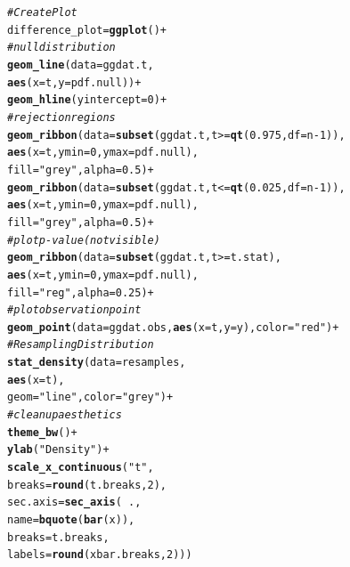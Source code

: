 \documentclass{article}\usepackage[]{graphicx}\usepackage[]{xcolor}
\makeatletter
\newcommand{\hlnum}[1]{\textcolor[rgb]{0.686,0.059,0.569}{#1}}%
\newcommand{\hlsng}[1]{\textcolor[rgb]{0.192,0.494,0.8}{#1}}%
\newcommand{\hlcom}[1]{\textcolor[rgb]{0.678,0.584,0.686}{\textit{#1}}}%
\newcommand{\hlopt}[1]{\textcolor[rgb]{0,0,0}{#1}}%
\newcommand{\hldef}[1]{\textcolor[rgb]{0.345,0.345,0.345}{#1}}%
\newcommand{\hlkwb}[1]{\textcolor[rgb]{0.69,0.353,0.396}{#1}}%
\newcommand{\hlkwc}[1]{\textcolor[rgb]{0.333,0.667,0.333}{#1}}%
\newcommand{\hlkwd}[1]{\textcolor[rgb]{0.737,0.353,0.396}{\textbf{#1}}}%
\newenvironment{kframe}{%
 \def\at@end@of@kframe{}%
 \ifinner\ifhmode%
  \def\at@end@of@kframe{\end{minipage}}%
  \begin{minipage}{\columnwidth}%
 \fi\fi%
 \def\FrameCommand##1{\hskip\@totalleftmargin \hskip-\fboxsep
 \colorbox{shadecolor}{##1}\hskip-\fboxsep
     \hskip-\linewidth \hskip-\@totalleftmargin \hskip\columnwidth}%
 \MakeFramed {\advance\hsize-\width
   \@totalleftmargin\z@ \linewidth\hsize
   \@setminipage}}%
 {\par\unskip\endMakeFramed%
 \at@end@of@kframe}
\newenvironment{knitrout}{}{} %
\makeatother
\begin{document}
\begin{enumerate}
\begin{enumerate}
\begin{knitrout}
\begin{kframe}
\begin{alltt}
\hlcom{# Create Plot}
\hldef{difference_plot} \hlkwb{=} \hlkwd{ggplot}\hldef{()} \hlopt{+}
\hlcom{# null distribution}
\hlkwd{geom_line}\hldef{(}\hlkwc{data}\hldef{=ggdat.t,}
          \hlkwd{aes}\hldef{(}\hlkwc{x}\hldef{=t,} \hlkwc{y}\hldef{=pdf.null))}\hlopt{+}
\hlkwd{geom_hline}\hldef{(}\hlkwc{yintercept}\hldef{=}\hlnum{0}\hldef{)}\hlopt{+}
\hlcom{# rejection regions}
\hlkwd{geom_ribbon}\hldef{(}\hlkwc{data}\hldef{=}\hlkwd{subset}\hldef{(ggdat.t, t}\hlopt{>=}\hlkwd{qt}\hldef{(}\hlnum{0.975}\hldef{,} \hlkwc{df}\hldef{=n}\hlopt{-}\hlnum{1}\hldef{)),}
            \hlkwd{aes}\hldef{(}\hlkwc{x}\hldef{=t,} \hlkwc{ymin}\hldef{=}\hlnum{0}\hldef{,} \hlkwc{ymax}\hldef{=pdf.null),}
            \hlkwc{fill}\hldef{=}\hlsng{"grey"}\hldef{,} \hlkwc{alpha}\hldef{=}\hlnum{0.5}\hldef{)}\hlopt{+}
\hlkwd{geom_ribbon}\hldef{(}\hlkwc{data}\hldef{=}\hlkwd{subset}\hldef{(ggdat.t, t}\hlopt{<=}\hlkwd{qt}\hldef{(}\hlnum{0.025}\hldef{,} \hlkwc{df}\hldef{=n}\hlopt{-}\hlnum{1}\hldef{)),}
            \hlkwd{aes}\hldef{(}\hlkwc{x}\hldef{=t,} \hlkwc{ymin}\hldef{=}\hlnum{0}\hldef{,} \hlkwc{ymax}\hldef{=pdf.null),}
            \hlkwc{fill}\hldef{=}\hlsng{"grey"}\hldef{,} \hlkwc{alpha}\hldef{=}\hlnum{0.5}\hldef{)}\hlopt{+}
\hlcom{# plot p-value (not visible)}
\hlkwd{geom_ribbon}\hldef{(}\hlkwc{data}\hldef{=}\hlkwd{subset}\hldef{(ggdat.t, t}\hlopt{>=}\hldef{t.stat),}
            \hlkwd{aes}\hldef{(}\hlkwc{x}\hldef{=t,} \hlkwc{ymin}\hldef{=}\hlnum{0}\hldef{,} \hlkwc{ymax}\hldef{=pdf.null),}
            \hlkwc{fill}\hldef{=}\hlsng{"reg"}\hldef{,} \hlkwc{alpha}\hldef{=}\hlnum{0.25}\hldef{)}\hlopt{+}
\hlcom{# plot observation point}
\hlkwd{geom_point}\hldef{(}\hlkwc{data}\hldef{=ggdat.obs,} \hlkwd{aes}\hldef{(}\hlkwc{x}\hldef{=t,} \hlkwc{y}\hldef{=y),} \hlkwc{color}\hldef{=}\hlsng{"red"}\hldef{)}\hlopt{+}
\hlcom{# Resampling Distribution}
\hlkwd{stat_density}\hldef{(}\hlkwc{data}\hldef{=resamples,}
             \hlkwd{aes}\hldef{(}\hlkwc{x}\hldef{=t),}
             \hlkwc{geom}\hldef{=}\hlsng{"line"}\hldef{,} \hlkwc{color}\hldef{=}\hlsng{"grey"}\hldef{)}\hlopt{+}
\hlcom{# clean up aesthetics}
\hlkwd{theme_bw}\hldef{()}\hlopt{+}
\hlkwd{ylab}\hldef{(}\hlsng{"Density"}\hldef{)}\hlopt{+}
\hlkwd{scale_x_continuous}\hldef{(}\hlsng{"t"}\hldef{,}
                   \hlkwc{breaks} \hldef{=} \hlkwd{round}\hldef{(t.breaks,}\hlnum{2}\hldef{),}
                   \hlkwc{sec.axis} \hldef{=} \hlkwd{sec_axis}\hldef{(}\hlopt{~}\hldef{.,}
                                       \hlkwc{name} \hldef{=} \hlkwd{bquote}\hldef{(}\hlkwd{bar}\hldef{(x)),}
                                       \hlkwc{breaks} \hldef{= t.breaks,}
                                       \hlkwc{labels} \hldef{=} \hlkwd{round}\hldef{(xbar.breaks,}\hlnum{2}\hldef{)))}
\end{alltt}
\end{kframe}
\end{knitrout}
  
\end{enumerate}
\end{enumerate}



\end{document}
